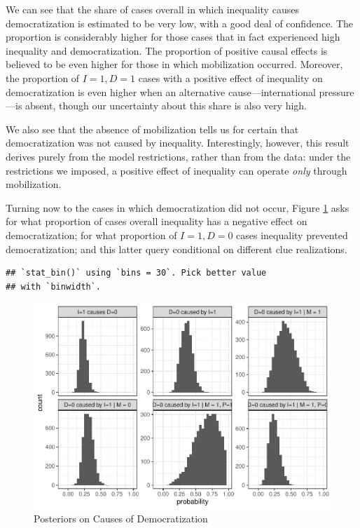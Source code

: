 \documentclass[
  12pt,
]{book}
\begin{document}
We can see that the share of cases overall in which inequality causes democratization is estimated to be very low, with a good deal of confidence. The proportion is considerably higher for those cases that in fact experienced high inequality and democratization. The proportion of positive causal effects is believed to be even higher for those in which mobilization occurred. Moreover, the proportion of \(I=1, D=1\) cases with a positive effect of inequality on democratization is even higher when an alternative cause---international pressure---is absent, though our uncertainty about this share is also very high.

We also see that the absence of mobilization tells us for certain that democratization was not caused by inequality. Interestingly, however, this result derives purely from the model restrictions, rather than from the data: under the restrictions we imposed, a positive effect of inequality can operate \emph{only} through mobilization.

Turning now to the cases in which democratization did not occur, Figure \ref{fig:mixedhist2} asks for what proportion of cases overall inequality has a negative effect on democratization; for what proportion of \(I=1, D=0\) cases inequality prevented democratization; and this latter query conditional on different clue realizations.

\begin{verbatim}
## `stat_bin()` using `bins = 30`. Pick better value
## with `binwidth`.
\end{verbatim}

\begin{figure}
\centering
\includegraphics{ii_files/figure-latex/mixedhist2-1.pdf}
\caption{\label{fig:mixedhist2}Posteriors on Causes of Democratization}
\end{figure}
\end{document}
